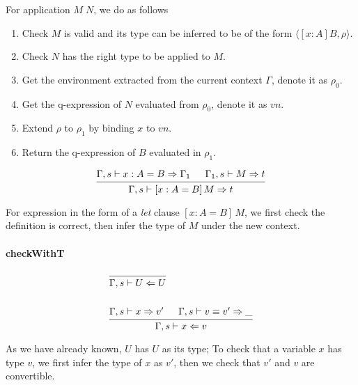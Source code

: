 \documentclass{article}
\theoremstyle{remark}
\begin{document}
For application $M \; N$, we do as follows
\begin{enumerate}
  \item Check $M$ is valid and its type can be inferred to be of the form $\langle [x : A] B, \rho \rangle$.
  \item Check $N$ has the right type to be applied to $M$.
  \item Get the environment extracted from the current context $\Gamma$, denote it as $\rho_0$.
  \item Get the q-expression of $N$ evaluated from $\rho_0$, denote it as $vn$.
  \item Extend $\rho$ to $\rho_1$ by binding $x$ to $vn$.
  \item Return the q-expression of $B$ evaluated in $\rho_1$.
\end{enumerate}

\begin{align}
  \begin{prooftree}
    \hypo{\Gamma,s \vdash x : A = B \Rightarrow \Gamma_1}
    \hypo{\Gamma_1,s \vdash M \Rightarrow t}
    \infer2{\Gamma,s \vdash [x : A = B]\,M \Rightarrow t}
  \end{prooftree}
\end{align}

For expression in the form of a \emph{let} clause $[x : A = B] \, M$, we first check the definition is correct, then infer the type of $M$ under the new context.

\paragraph{checkWithT}
\begin{align}
  &\begin{prooftree}
    \infer0{\Gamma,s \vdash U \Leftarrow U}
  \end{prooftree} \\
  \nonumber \\
  &\begin{prooftree}
    \hypo{\Gamma,s \vdash x \Rightarrow v'}
    \hypo{\Gamma,s \vdash v \equiv v' \Rightarrow \_}
    \infer2{\Gamma,s \vdash x \Leftarrow v}
  \end{prooftree}
\end{align}

As we have already known, $U$ has $U$ as its type; To check that a variable $x$ has type $v$, we first infer the type of $x$ as $v'$, then we check that $v'$ and $v$ are convertible.
\end{document}
